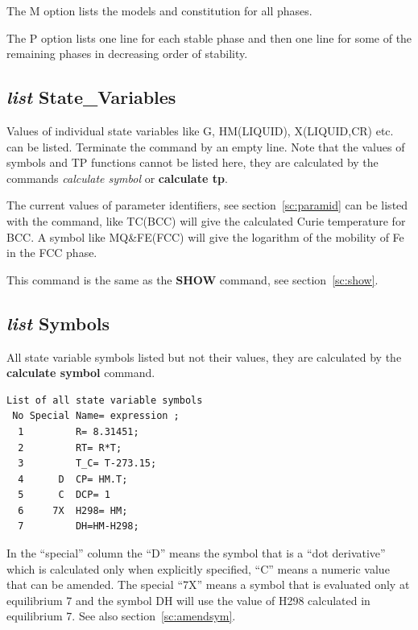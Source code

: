 \documentclass[11pt]{article}
\begin{document}
The M option lists the models and constitution for all phases.

The P option lists one line for each stable phase and then one line
for some of the remaining phases in decreasing order of stability.

\hypertarget{List state variables}{}
\subsection{{\em list} State\_Variables}\label{sc:list_statevar}

Values of individual state variables like G, HM(LIQUID), X(LIQUID,CR)
etc. can be listed.  Terminate the command by an empty line.  Note
that the values of symbols and TP functions cannot be listed here,
they are calculated by the commands {\em calculate symbol} or {\bf
  calculate tp}.

The current values of parameter identifiers, see
section~\ref{sc:paramid} can be listed with the command, like TC(BCC)
will give the calculated Curie temperature for BCC.  A symbol like
MQ\&FE(FCC) will give the logarithm of the mobility of Fe in the FCC
phase.

This command is the same as the {\bf SHOW} command, see
section~\ref{sc:show}.

\hypertarget{List symbols}{}
\subsection{{\em list} Symbols}\label{sc:listsymbol}

All state variable symbols listed but not their values, they are
calculated by the {\bf calculate symbol} command.

\begin{verbatim}
List of all state variable symbols
 No Special Name= expression ;
  1         R= 8.31451;
  2         RT= R*T;
  3         T_C= T-273.15;
  4      D  CP= HM.T;
  5      C  DCP= 1
  6     7X  H298= HM;
  7         DH=HM-H298;
\end{verbatim}

In the ``special'' column the ``D'' means the symbol that is a ``dot
derivative'' which is calculated only when explicitly specified, ``C''
means a numeric value that can be amended.  The special ``7X'' means a
symbol that is evaluated only at equilibrium 7 and the symbol DH will
use the value of H298 calculated in equilibrium 7.  See also
section~\ref{sc:amendsym}.
\end{document}
